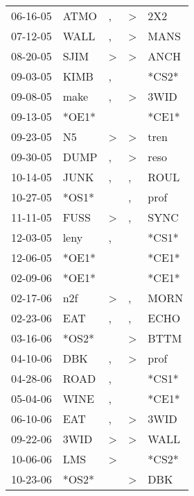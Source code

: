 \begin{supertabular}{lllll}
 06-16-05 &   ATMO &                , &     \textgreater &    2X2 \\
 07-12-05 &   WALL &                , &     \textgreater &   MANS \\
 08-20-05 &   SJIM &     \textgreater &     \textgreater &   ANCH \\
 09-03-05 &   KIMB &                , &                  &  *CS2* \\
 09-08-05 &   make &                , &     \textgreater &   3WID \\
 09-13-05 &  *OE1* &                  &                  &  *CE1* \\
 09-23-05 &     N5 &     \textgreater &     \textgreater &   tren \\
 09-30-05 &   DUMP &                , &     \textgreater &   reso \\
 10-14-05 &   JUNK &                , &                , &   ROUL \\
 10-27-05 &  *OS1* &                  &                , &   prof \\
 11-11-05 &   FUSS &     \textgreater &                , &   SYNC \\
 12-03-05 &   leny &                , &                  &  *CS1* \\
 12-06-05 &  *OE1* &                  &                  &  *CE1* \\
 02-09-06 &  *OE1* &                  &                  &  *CE1* \\
 02-17-06 &    n2f &     \textgreater &                , &   MORN \\
 02-23-06 &    EAT &                , &                , &   ECHO \\
 03-16-06 &  *OS2* &                  &     \textgreater &   BTTM \\
 04-10-06 &    DBK &                , &     \textgreater &   prof \\
 04-28-06 &   ROAD &                , &                  &  *CS1* \\
 05-04-06 &   WINE &                , &                  &  *CE1* \\
 06-10-06 &    EAT &                , &     \textgreater &   3WID \\
 09-22-06 &   3WID &     \textgreater &     \textgreater &   WALL \\
 10-06-06 &    LMS &     \textgreater &                  &  *CS2* \\
 10-23-06 &  *OS2* &                  &     \textgreater &    DBK \\

\end{supertabular}
